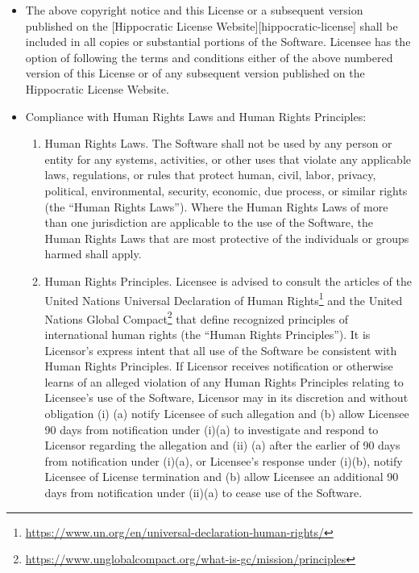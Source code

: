 \documentclass[krantzl]{krantz}
\newcommand{\hreffoot}[2]{{#1}\footnote{\href{#2}{#2}}}
\begin{document}
\begin{itemize}

\item 

The above copyright notice and this License or a subsequent version published
    on the [Hippocratic License Website][hippocratic-license] shall be
    included in all copies or substantial portions of the Software. Licensee has
    the option of following the terms and conditions either of the above
    numbered version of this License or of any subsequent version published on
    the Hippocratic License Website.



\item 

Compliance with Human Rights Laws and Human Rights Principles:

\begin{enumerate}

\item 

Human Rights Laws. The Software shall not be used by any person or
    entity for any systems, activities, or other uses that violate any
    applicable laws, regulations, or rules that protect human, civil, labor,
    privacy, political, environmental, security, economic, due process, or
    similar rights (the “Human Rights Laws”). Where the Human Rights Laws of
    more than one jurisdiction are applicable to the use of the Software,
    the Human Rights Laws that are most protective of the individuals or
    groups harmed shall apply.



\item 

Human Rights Principles. Licensee is advised to consult the articles of
    the \hreffoot{United Nations Universal Declaration of Human Rights}{https://www.un.org/en/universal-declaration-human-rights/} and the
    \hreffoot{United Nations Global Compact}{https://www.unglobalcompact.org/what-is-gc/mission/principles} that define recognized principles
    of international human rights (the “Human Rights Principles”). It is
    Licensor’s express intent that all use of the Software be consistent
    with Human Rights Principles. If Licensor receives notification or
    otherwise learns of an alleged violation of any Human Rights Principles
    relating to Licensee’s use of the Software, Licensor may in its
    discretion and without obligation (i) (a) notify Licensee of such
    allegation and (b) allow Licensee 90 days from notification under (i)(a)
    to investigate and respond to Licensor regarding the allegation and (ii)
    (a) after the earlier of 90 days from notification under (i)(a), or
    Licensee’s response under (i)(b), notify Licensee of License termination
    and (b) allow Licensee an additional 90 days from notification under
    (ii)(a) to cease use of the Software.




\end{enumerate}
\end{itemize}
\end{document}
